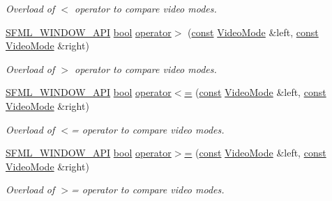 \begin{DoxyCompactItemize}
\begin{DoxyCompactList}\small\item\em Overload of $<$ operator to compare video modes. \end{DoxyCompactList}\item 
\hyperlink{sfml_2dep_2_s_f_m_l-2_84_82_2include_2_s_f_m_l_2_window_2_export_8hpp_a1ab885b7907ee088350359516d68be64}{S\-F\-M\-L\-\_\-\-W\-I\-N\-D\-O\-W\-\_\-\-A\-P\-I} \hyperlink{term__entry_8h_a002004ba5d663f149f6c38064926abac}{bool} \hyperlink{classsf_1_1_video_mode_ab6e5b2c65a428a4b56de8551b3706a36}{operator$>$} (\hyperlink{term__entry_8h_a57bd63ce7f9a353488880e3de6692d5a}{const} \hyperlink{classsf_1_1_video_mode}{Video\-Mode} \&left, \hyperlink{term__entry_8h_a57bd63ce7f9a353488880e3de6692d5a}{const} \hyperlink{classsf_1_1_video_mode}{Video\-Mode} \&right)
\begin{DoxyCompactList}\small\item\em Overload of $>$ operator to compare video modes. \end{DoxyCompactList}\item 
\hyperlink{sfml_2dep_2_s_f_m_l-2_84_82_2include_2_s_f_m_l_2_window_2_export_8hpp_a1ab885b7907ee088350359516d68be64}{S\-F\-M\-L\-\_\-\-W\-I\-N\-D\-O\-W\-\_\-\-A\-P\-I} \hyperlink{term__entry_8h_a002004ba5d663f149f6c38064926abac}{bool} \hyperlink{classsf_1_1_video_mode_a09b0a83f9135d934e540800bad12f0ca}{operator$<$=} (\hyperlink{term__entry_8h_a57bd63ce7f9a353488880e3de6692d5a}{const} \hyperlink{classsf_1_1_video_mode}{Video\-Mode} \&left, \hyperlink{term__entry_8h_a57bd63ce7f9a353488880e3de6692d5a}{const} \hyperlink{classsf_1_1_video_mode}{Video\-Mode} \&right)
\begin{DoxyCompactList}\small\item\em Overload of $<$= operator to compare video modes. \end{DoxyCompactList}\item 
\hyperlink{sfml_2dep_2_s_f_m_l-2_84_82_2include_2_s_f_m_l_2_window_2_export_8hpp_a1ab885b7907ee088350359516d68be64}{S\-F\-M\-L\-\_\-\-W\-I\-N\-D\-O\-W\-\_\-\-A\-P\-I} \hyperlink{term__entry_8h_a002004ba5d663f149f6c38064926abac}{bool} \hyperlink{classsf_1_1_video_mode_a7f7983e336203d34c9878c77fff60f1f}{operator$>$=} (\hyperlink{term__entry_8h_a57bd63ce7f9a353488880e3de6692d5a}{const} \hyperlink{classsf_1_1_video_mode}{Video\-Mode} \&left, \hyperlink{term__entry_8h_a57bd63ce7f9a353488880e3de6692d5a}{const} \hyperlink{classsf_1_1_video_mode}{Video\-Mode} \&right)
\begin{DoxyCompactList}\small\item\em Overload of $>$= operator to compare video modes. \end{DoxyCompactList}\item 

\end{DoxyCompactItemize}
